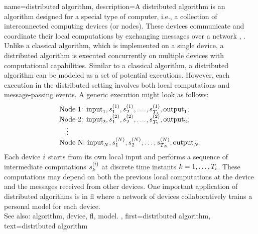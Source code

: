 {name={distributed algorithm},
	description={A distributed \gls{algorithm} is an \gls{algorithm} designed for 
		a special type of computer, i.e., a collection of interconnected computing devices (or nodes). 
		These devices communicate and coordinate their local computations by exchanging 
		messages over a network \cite{IntroDistAlg}, \cite{ParallelDistrBook}. Unlike a classical \gls{algorithm}, 
		which is implemented on a single \gls{device}, a distributed \gls{algorithm} is 
		executed concurrently on multiple \glspl{device} with computational capabilities. 
		Similar to a classical \gls{algorithm}, a distributed \gls{algorithm} can be modeled as a 
		set of potential executions. However, each execution in the distributed setting involves 
		both local computations and message-passing events. A generic execution might look as 
		follows:
		\[
		\begin{array}{l}
			\text{Node 1: } {\rm input}_1, s_1^{(1)}, s_2^{(1)}, \ldots, s_{T_1}^{(1)}, {\rm output}_1; \\
			\text{Node 2: } {\rm input}_2, s_1^{(2)}, s_2^{(2)}, \ldots, s_{T_2}^{(2)}, {\rm output}_2; \\
			\quad \vdots \\
			\text{Node N: } {\rm input}_N, s_1^{(N)}, s_2^{(N)}, \ldots, s_{T_N}^{(N)}, {\rm output}_N.
		\end{array}
		\]
		Each \gls{device} $i$ starts from its own local input and performs a sequence of 
		intermediate computations $s_{k}^{(i)}$ at discrete time instants $k = 1, \dots, T_i$. 
		These computations may depend on both the previous local computations at the \gls{device} 
		and the messages received from other \glspl{device}. One important application of distributed 
		\glspl{algorithm} is in \gls{fl} where a network of \glspl{device} collaboratively trains a personal \gls{model} 
		for each \gls{device}. 
					\\ 
		See also: \gls{algorithm}, \gls{device}, \gls{fl}, \gls{model}.
		},
	first={distributed algorithm}, text={distributed algorithm}
}



